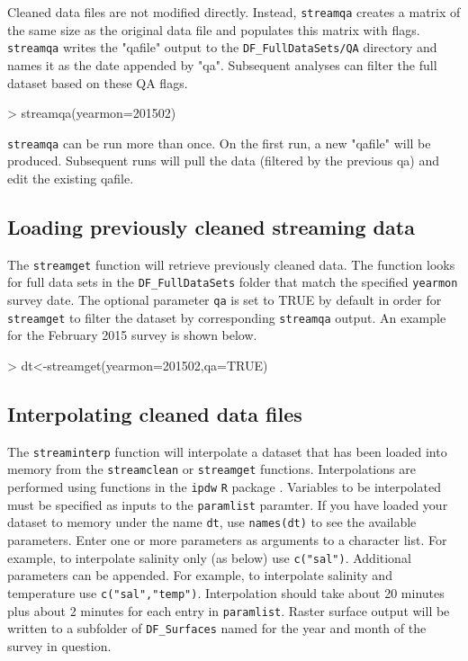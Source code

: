 \documentclass[12pt]{article}
\begin{document}
Cleaned data files are not modified directly. Instead, \texttt{streamqa} creates a matrix of the same size as the original data file and populates this matrix with flags. \texttt{streamqa} writes the "qafile" output to the \verb|DF_FullDataSets/QA| directory and names it as the date appended by "qa". Subsequent analyses can filter the full dataset based on these QA flags.

\begin{Schunk}
\begin{Sinput}
> streamqa(yearmon=201502)
\end{Sinput}
\end{Schunk}

\texttt{streamqa} can be run more than once. On the first run, a new "qafile" will be produced. Subsequent runs will pull the data (filtered by the previous qa) and edit the existing qafile.

\subsection{Loading previously cleaned streaming data}

The \texttt{streamget} function will retrieve previously cleaned data. The function looks for full data sets in the \verb|DF_FullDataSets| folder that match the specified \texttt{yearmon} survey date. The optional parameter \texttt{qa} is set to TRUE by default in order for \texttt{streamget} to filter the dataset by corresponding \texttt{streamqa} output. An example for the February 2015 survey is shown below.

\begin{Schunk}
\begin{Sinput}
> dt<-streamget(yearmon=201502,qa=TRUE)
\end{Sinput}
\end{Schunk}

\subsection{Interpolating cleaned data files}

The \texttt{streaminterp} function will interpolate a dataset that has been loaded into memory from the \texttt{streamclean} or \texttt{streamget} functions. Interpolations are performed using functions in the \texttt{ipdw} \texttt{R} package \citep{ipdw}. Variables to be interpolated must be specified as inputs to the \texttt{paramlist} paramter. If you have loaded your dataset to memory under the name \texttt{dt}, use \texttt{names(dt)} to see the available parameters. Enter one or more parameters as arguments to a character list. For example, to interpolate salinity only (as below) use \texttt{c("sal")}. Additional parameters can be appended. For example, to interpolate salinity and temperature use \texttt{c("sal","temp")}. Interpolation should take about 20 minutes plus about 2 minutes for each entry in \texttt{paramlist}. Raster surface output will be written to a subfolder of \verb|DF_Surfaces| named for the year and month of the survey in question.\\
\end{document}
